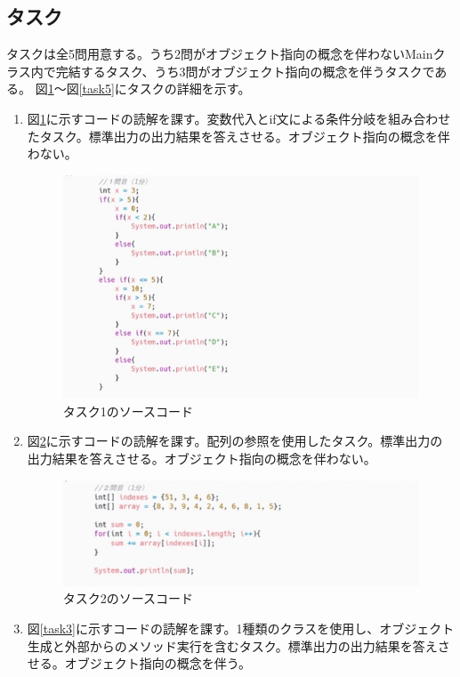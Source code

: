 \documentclass[paper=a4paper,fontsize=11pt]{jlreq}
\begin{document}
  \subsection{タスク}
    タスクは全5問用意する。うち2問がオブジェクト指向の概念を伴わないMainクラス内で完結するタスク、うち3問がオブジェクト指向の概念を伴うタスクである。
    図\ref{task1}～図\ref{task5}にタスクの詳細を示す。\\
    \begin{enumerate}[label=タスク\arabic*:]
      \item 図\ref{task1}に示すコードの読解を課す。変数代入とif文による条件分岐を組み合わせたタスク。標準出力の出力結果を答えさせる。オブジェクト指向の概念を伴わない。
      \begin{figure}[h]
        \centering
        \includegraphics[height=0.5\linewidth]{プログラム画像_タスク1.jpg}
        \caption{タスク1のソースコード}
        \label{task1}
      \end{figure}
      \FloatBarrier
      \item 図\ref{task2}に示すコードの読解を課す。配列の参照を使用したタスク。標準出力の出力結果を答えさせる。オブジェクト指向の概念を伴わない。
      \begin{figure}[h]
        \centering
        \includegraphics[height=0.25\linewidth]{プログラム画像_タスク2.jpg}
        \caption{タスク2のソースコード}
        \label{task2}
      \end{figure}
      \FloatBarrier
      \item 図\ref{task3}に示すコードの読解を課す。1種類のクラスを使用し、オブジェクト生成と外部からのメソッド実行を含むタスク。標準出力の出力結果を答えさせる。オブジェクト指向の概念を伴う。

\end{enumerate}
\end{document}
